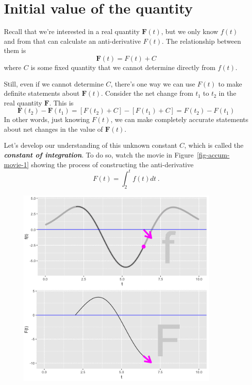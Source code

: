 \documentclass[
  letterpaper,
  DIV=11,
  numbers=noendperiod,
  oneside]{scrreprt}
\begin{document}
\hypertarget{initial-value-of-the-quantity}{%
\section{Initial value of the
quantity}\label{initial-value-of-the-quantity}}

Recall that we're interested in a real quantity \({\mathbf F}(t)\), but
we only know \(f(t)\) and from that can calculate an anti-derivative
\(F(t)\). The relationship between them is \[{\mathbf F}(t) = F(t) + C\]
where \(C\) is some fixed quantity that we cannot determine directly
from \(f(t)\).

Still, even if we cannot determine \(C\), there's one way we can use
\(F(t)\) to make definite statements about \({\mathbf F}(t)\). Consider
the net change from \(t_1\) to \(t_2\) in the real quantity
\({\mathbf F}\). This is
\[{\mathbf F}(t_2) - {\mathbf F}(t_1) =  \left[F(t_2) + C\right] - \left[F(t_1) + C\right] = F(t_2) - F(t_1)\]
In other words, just knowing \(F(t)\), we can make completely accurate
statements about net changes in the value of \({\mathbf F}(t)\).

Let's develop our understanding of this unknown constant \(C\), which is
called the \textbf{\emph{constant of integration}}. To do so, watch the
movie in Figure~\ref{fig-accum-movie-1} showing the process of
constructing the anti-derivative \[F(t) = \int_2^t f(t) dt\ .\]

\begin{figure}


{\centering \includegraphics[width=0.9\textwidth,height=\textheight]{Accumulation/www/arrow-plot-still.png}

}

\end{figure}
\end{document}
